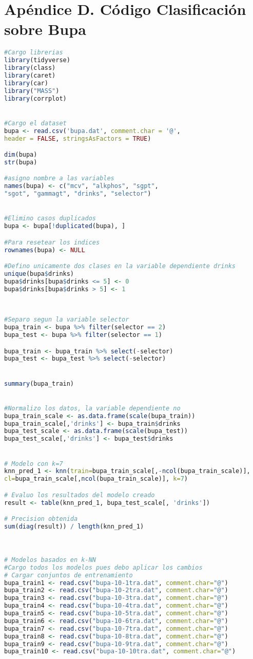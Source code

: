 \section{Apéndice D. Código Clasificación sobre Bupa}

\begin{lstlisting}[language=R]
#Cargo librerias
library(tidyverse)
library(class)
library(caret)
library(car)
library("MASS")
library(corrplot)


#Cargo el dataset
bupa <- read.csv('bupa.dat', comment.char = '@', 
header = FALSE, stringsAsFactors = TRUE)

dim(bupa)
str(bupa)

#asigno nombre a las variables
names(bupa) <- c("mcv", "alkphos", "sgpt",
"sgot", "gammagt", "drinks", "selector")


#Elimino casos duplicados
bupa <- bupa[!duplicated(bupa), ]

#Para resetear los indices
rownames(bupa) <- NULL

#Defino unicamente dos clases en la variable dependiente drinks
unique(bupa$drinks)
bupa$drinks[bupa$drinks <= 5] <- 0
bupa$drinks[bupa$drinks > 5] <- 1
	
	
	
#Separo segun la variable selector
bupa_train <- bupa %>% filter(selector == 2)
bupa_test <- bupa %>% filter(selector == 1)

bupa_train <- bupa_train %>% select(-selector)
bupa_test <- bupa_test %>% select(-selector)


summary(bupa_train)


#Normalizo los datos, la variable dependiente no
bupa_train_scale <- as.data.frame(scale(bupa_train))
bupa_train_scale[,'drinks'] <- bupa_train$drinks
bupa_test_scale <- as.data.frame(scale(bupa_test))
bupa_test_scale[,'drinks'] <- bupa_test$drinks


# Modelo con k=7
knn_pred_1 <- knn(train=bupa_train_scale[,-ncol(bupa_train_scale)],                                                  test=bupa_test_scale[,-ncol(bupa_test_scale)],
cl=bupa_train_scale[,ncol(bupa_train_scale)], k=7)

# Evaluo los resultados del modelo creado
result <- table(knn_pred_1, bupa_test_scale[, 'drinks'])

# Precision obtenida
sum(diag(result)) / length(knn_pred_1)



# Modelos basados en k-NN
#Cargo todos los modelos pues debo aplicar los cambios
# Cargar conjuntos de entrenamiento
bupa_train1 <- read.csv("bupa-10-1tra.dat", comment.char="@")
bupa_train2 <- read.csv("bupa-10-2tra.dat", comment.char="@")
bupa_train3 <- read.csv("bupa-10-3tra.dat", comment.char="@")
bupa_train4 <- read.csv("bupa-10-4tra.dat", comment.char="@")
bupa_train5 <- read.csv("bupa-10-5tra.dat", comment.char="@")
bupa_train6 <- read.csv("bupa-10-6tra.dat", comment.char="@")
bupa_train7 <- read.csv("bupa-10-7tra.dat", comment.char="@")
bupa_train8 <- read.csv("bupa-10-8tra.dat", comment.char="@")
bupa_train9 <- read.csv("bupa-10-9tra.dat", comment.char="@")
bupa_train10 <- read.csv("bupa-10-10tra.dat", comment.char="@")


\end{lstlisting}
